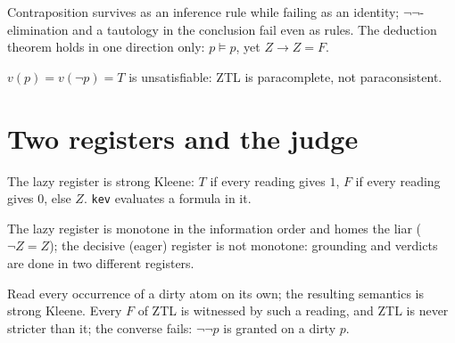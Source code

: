 \begin{theorem}\label{thm:split}
  \leanok
  Contraposition survives as an inference rule while failing as an identity;
  $\neg\neg$-elimination and a tautology in the conclusion fail even as rules.
  The deduction theorem holds in one direction only: $p\vDash p$, yet
  $Z\to Z=F$.
\end{theorem}

\begin{theorem}[No gluts]\label{thm:nogluts}
  \leanok
  $v(p)=v(\neg p)=T$ is unsatisfiable: ZTL is paracomplete, not
  paraconsistent.
\end{theorem}

\chapter{Two registers and the judge}

\begin{definition}\label{def:kleene}
  \leanok
  The lazy register is strong Kleene: $T$ if every reading gives $1$, $F$ if
  every reading gives $0$, else $Z$. \texttt{kev} evaluates a formula in it.
\end{definition}

\begin{theorem}\label{thm:kleene}
  \leanok
  The lazy register is monotone in the information order and homes the liar
  ($\neg Z=Z$); the decisive (eager) register is not monotone: grounding and
  verdicts are done in two different registers.
\end{theorem}

\begin{theorem}\label{thm:dirty}
  \leanok
  Read every occurrence of a dirty atom on its own; the resulting semantics is
  strong Kleene. Every $F$ of ZTL is witnessed by such a reading, and ZTL is
  never stricter than it; the converse fails: $\neg\neg p$ is granted on a
  dirty $p$.
\end{theorem}

